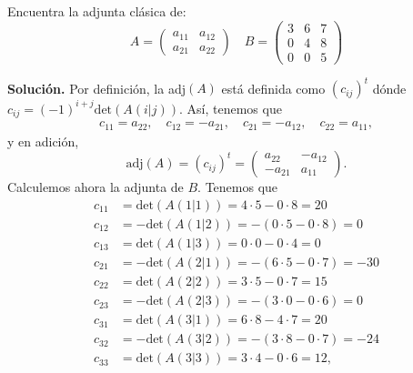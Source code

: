 \documentclass[11pt]{scrartcl}
\begin{document}
\begin{mdframed}[style=mdpurplebox, frametitle={Ejercicio 5, Tarea 01, Álgebra Lineal II}]
    Encuentra la adjunta clásica de:
    \[
    A=
    \begin{pmatrix}
        a_{11} & a_{12} \\
        a_{21} & a_{22 }
    \end{pmatrix} \quad
    B=
    \begin{pmatrix}
        3 & 6 & 7 \\
        0 & 4 & 8 \\
        0 & 0 & 5
    \end{pmatrix}
    \]
\end{mdframed}
\textbf{Solución.} Por definición, la adj$(A)$ está definida como $(c_{ij})^t$ dónde $c_{ij}=(-1)^{i+j}\text{det}\left(A\left(i|j\right)\right)$.
Así, tenemos que
\begin{align*}
    c_{11}=a_{22}, \quad c_{12}=-a_{21}, \quad c_{21}=-a_{12}, \quad c_{22}=a_{11},
\end{align*}
y en adición,
\begin{equation*}
    \text{adj}(A)=(c_{ij})^t=
    \begin{pmatrix}
        a_{22} & -a_{12} \\
        -a_{21} & a_{11}
    \end{pmatrix}.
\end{equation*}
Calculemos ahora la adjunta de $B$. Tenemos que
\begin{align*}
    c_{11}&=\text{det}\left(A\left(1|1\right)\right)=4\cdot 5 - 0\cdot 8=20 \\
    c_{12}&=-\text{det}\left(A\left(1|2\right)\right)=-\left(0\cdot 5 - 0\cdot 8\right)=0 \\
    c_{13}&=\text{det}\left(A\left(1|3\right)\right)=0\cdot 0 - 0\cdot 4=0 \\
    c_{21}&=-\text{det}\left(A\left(2|1\right)\right)=-\left(6\cdot 5 - 0\cdot 7\right)=-30 \\
    c_{22}&=\text{det}\left(A\left(2|2\right)\right)=3\cdot 5 - 0\cdot 7=15 \\
    c_{23}&=-\text{det}\left(A\left(2|3\right)\right)=-\left(3\cdot 0 - 0\cdot 6\right)=0 \\
    c_{31}&=\text{det}\left(A\left(3|1\right)\right)=6\cdot 8 - 4\cdot 7=20 \\
    c_{32}&=-\text{det}\left(A\left(3|2\right)\right)=-\left(3\cdot 8 - 0\cdot 7\right)=-24 \\
    c_{33}&=\text{det}\left(A\left(3|3\right)\right)=3\cdot 4 - 0\cdot 6=12,
\end{align*}
\end{document}
